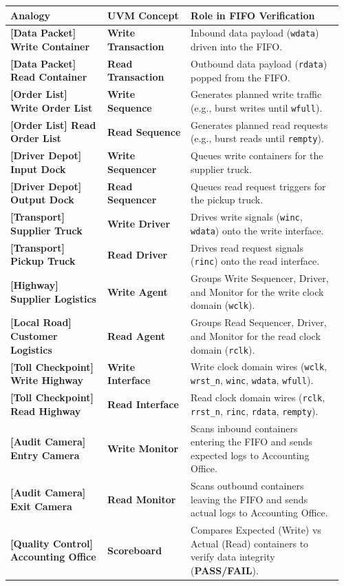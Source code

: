 \documentclass[
]{article}
\newcounter{none} %
\begin{document}
{\def\LTcaptype{none} %
\begin{longtable}[]{@{}p{0.28\linewidth}p{0.24\linewidth}p{0.44\linewidth}@{}}
\toprule\noalign{}
Analogy & UVM Concept & Role in FIFO Verification \\
\midrule\noalign{}
\endhead
\bottomrule\noalign{}
\endlastfoot
\textbf{[Data Packet] Write Container} & \textbf{Write Transaction} & Inbound data
payload (\texttt{wdata}) driven into the FIFO. \\
\textbf{[Data Packet] Read Container} & \textbf{Read Transaction} & Outbound data
payload (\texttt{rdata}) popped from the FIFO. \\
\textbf{[Order List] Write Order List} & \textbf{Write Sequence} & Generates
planned write traffic (e.g., burst writes until \texttt{wfull}). \\
\textbf{[Order List] Read Order List} & \textbf{Read Sequence} & Generates planned
read requests (e.g., burst reads until \texttt{rempty}). \\
\textbf{[Driver Depot] Input Dock} & \textbf{Write Sequencer} & Queues write
containers for the supplier truck. \\
\textbf{[Driver Depot] Output Dock} & \textbf{Read Sequencer} & Queues read request
triggers for the pickup truck. \\
\textbf{[Transport] Supplier Truck} & \textbf{Write Driver} & Drives write
signals (\texttt{winc}, \texttt{wdata}) onto the write interface. \\
\textbf{[Transport] Pickup Truck} & \textbf{Read Driver} & Drives read request
signals (\texttt{rinc}) onto the read interface. \\
\textbf{[Highway] Supplier Logistics} & \textbf{Write Agent} & Groups Write
Sequencer, Driver, and Monitor for the write clock domain
(\texttt{wclk}). \\
\textbf{[Local Road] Customer Logistics} & \textbf{Read Agent} & Groups Read
Sequencer, Driver, and Monitor for the read clock domain
(\texttt{rclk}). \\
\textbf{[Toll Checkpoint] Write Highway} & \textbf{Write Interface} & Write clock
domain wires (\texttt{wclk}, \texttt{wrst\_n}, \texttt{winc},
\texttt{wdata}, \texttt{wfull}). \\
\textbf{[Toll Checkpoint] Read Highway} & \textbf{Read Interface} & Read clock domain
wires (\texttt{rclk}, \texttt{rrst\_n}, \texttt{rinc}, \texttt{rdata},
\texttt{rempty}). \\
\textbf{[Audit Camera] Entry Camera} & \textbf{Write Monitor} & Scans inbound
containers entering the FIFO and sends expected logs to Accounting
Office. \\
\textbf{[Audit Camera] Exit Camera} & \textbf{Read Monitor} & Scans outbound
containers leaving the FIFO and sends actual logs to Accounting
Office. \\
\textbf{[Quality Control] Accounting Office} & \textbf{Scoreboard} & Compares Expected
(Write) vs Actual (Read) containers to verify data integrity
(\textbf{PASS/FAIL}). \\
\end{longtable}
}
\end{document}
